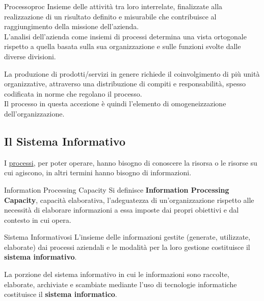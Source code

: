 \begin{definition}{Processo}{proc}
    Insieme delle attività tra loro interrelate, finalizzate alla realizzazione di un risultato definito e misurabile che contribuisce al raggiungimento della missione dell'azienda.
    \\
    L'analisi dell'azienda come insiemi di processi determina una vista ortogonale rispetto a quella basata sulla sua organizzazione e sulle funzioni svolte dalle diverse divisioni.
\end{definition}
\begin{note}
    La produzione di prodotti/servizi in genere richiede il coinvolgimento di più unità organizzative, attraverso una distribuzione di compiti e responsabilità, spesso codificata in norme che regolano il processo.
    \\
    Il processo in questa accezione è quindi l'elemento di omogeneizzazione dell'organizzazione.
\end{note}
%
\subsection{Il Sistema Informativo}\label{sub:il_sistema_informativo} %
I \hyperref[def:proc]{processi}, per poter operare, hanno bisogno di conoscere la risorsa o le risorse su cui agiscono, in altri termini hanno bisogno di informazioni.
\begin{definition}{Information Processing Capacity}{}
    Si definisce \textbf{Information Processing Capacity}, capacità elaborativa, l'adeguatezza di un'organizzazione rispetto alle necessità di elaborare informazioni a essa imposte dai propri obiettivi e dal contesto in cui opera.
\end{definition}
\begin{definition}{Sistema Informativo}{si}
    L'insieme delle informazioni gestite (generate, utilizzate, elaborate) dai processi aziendali e le modalità per la loro gestione costituisce il \textbf{sistema informativo}.
\end{definition}
La porzione del sistema informativo in cui le informazioni sono raccolte, elaborate, archiviate e scambiate mediante l'uso di tecnologie informatiche costituisce il \textbf{sistema informatico}.
%
